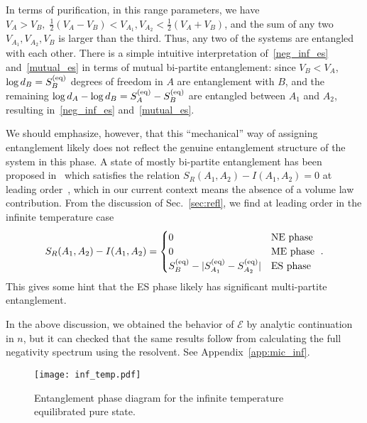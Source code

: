 \documentclass[a4paper,11pt]{article}
\newcommand\half{{\ensuremath{\frac{1}{2}}}}
\newcommand{\be}{\begin{equation}}
\newcommand{\ee}{\end{equation}}
\newcommand\ha{{\half}}
\newcommand\sE{{\ensuremath{{\mathcal E}}}}
\begin{document}
\begin{enumerate}
In terms of purification, in this range parameters, we have $V_A > V_B, \; \ha (V_A - V_B) < V_{A_1} , V_{A_2} < \ha (V_A + V_B)$, and the sum of any two $V_{A_1}, V_{A_2}, V_B$ is larger than the third. Thus, any two of the systems are entangled with each other. There is a simple intuitive interpretation of~\eqref{neg_inf_es} and~\eqref{mutual_es} in terms of mutual bi-partite entanglement: since $V_B < V_A$, $\log d_B = S_B^{\rm (eq)} $ degrees of freedom in $A$ are entanglement with $B$, and the remaining $\log d_A - \log d_B = S_A^{(\rm eq)} - S_B^{\rm (eq)}$ are entangled between $A_1$ and $A_2$, resulting in~\eqref{neg_inf_es} and~\eqref{mutual_es}. 

We should emphasize, however, that this ``mechanical'' way of assigning entanglement likely does not 
reflect the genuine entanglement structure of the system in this phase. 
A state of mostly bi-partite entanglement has been proposed in~\cite{2019CMaPh.376..609C} which satisfies the relation $S_R (A_1, A_2) - I (A_1, A_2) =0$ 
at leading order~\cite{2020JHEP...04..208A}, which in our current context means the absence of a volume law contribution. 
From the discussion of Sec.~\ref{sec:refl}, we find at leading order in the infinite temperature case 
\be 
S_R (A_1, A_2) - I (A_1, A_2) = \begin{cases} 
0 & \text{NE phase} \\
0 & \text{ME phase} \\
S_B^{\rm (eq)} - |S_{A_1}^{\rm (eq)} - S_{A_2}^{\rm (eq)}| & \text{ES phase}
\end{cases} 
 \ .
\ee
This gives some hint that the ES phase likely has significant multi-partite entanglement. 




\end{enumerate} 
In the above discussion, we obtained the behavior of $\sE$ by analytic continuation in $n$, but it can checked that 
the same results follow from calculating the full negativity spectrum using the resolvent. See Appendix~\ref{app:mic_inf}.




\begin{figure}[] 
\centering 
\texttt{[image: inf\_temp.pdf]}
\caption{Entanglement phase diagram for the infinite temperature equilibrated pure state.}
\label{fig:inf_phases}
\end{figure}
\end{document}
